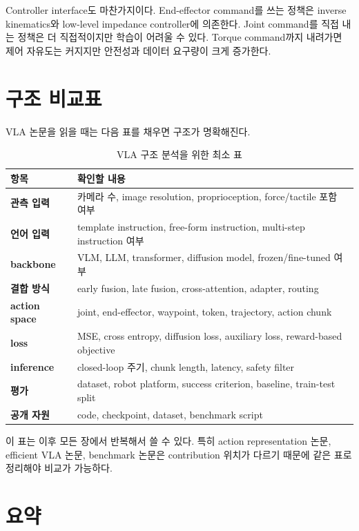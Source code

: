 Controller interface도 마찬가지이다. End-effector command를 쓰는 정책은 inverse kinematics와 low-level impedance controller에 의존한다. Joint command를 직접 내는 정책은 더 직접적이지만 학습이 어려울 수 있다. Torque command까지 내려가면 제어 자유도는 커지지만 안전성과 데이터 요구량이 크게 증가한다.

\section{구조 비교표}

VLA 논문을 읽을 때는 다음 표를 채우면 구조가 명확해진다.

\begin{table}[t]
  \centering
  \caption{VLA 구조 분석을 위한 최소 표}
  \label{tab:architecture_template}
  \begin{tabularx}{\textwidth}{>{\bfseries}p{34mm}X}
    \toprule
    항목 & 확인할 내용 \\
    \midrule
    관측 입력 & 카메라 수, image resolution, proprioception, force/tactile 포함 여부 \\
    언어 입력 & template instruction, free-form instruction, multi-step instruction 여부 \\
    backbone & VLM, LLM, transformer, diffusion model, frozen/fine-tuned 여부 \\
    결합 방식 & early fusion, late fusion, cross-attention, adapter, routing \\
    action space & joint, end-effector, waypoint, token, trajectory, action chunk \\
    loss & MSE, cross entropy, diffusion loss, auxiliary loss, reward-based objective \\
    inference & closed-loop 주기, chunk length, latency, safety filter \\
    평가 & dataset, robot platform, success criterion, baseline, train-test split \\
    공개 자원 & code, checkpoint, dataset, benchmark script \\
    \bottomrule
  \end{tabularx}
\end{table}

이 표는 이후 모든 장에서 반복해서 쓸 수 있다. 특히 action representation 논문, efficient VLA 논문, benchmark 논문은 contribution 위치가 다르기 때문에 같은 표로 정리해야 비교가 가능하다.

\section{요약}

